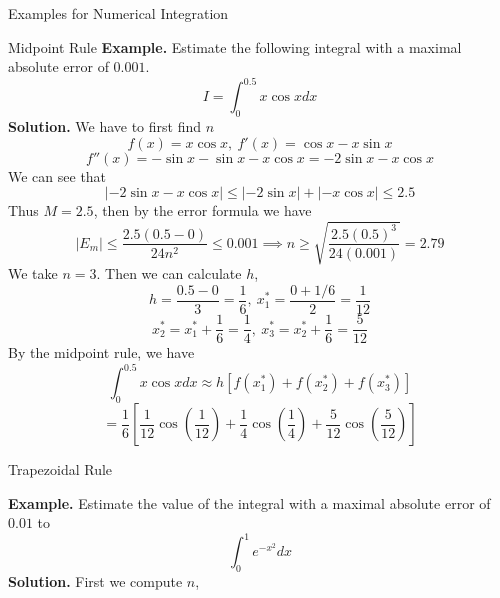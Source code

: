\documentclass{article}
\begin{document}
\begin{multicols*}{3}
\begin{blackbox}{Examples for Numerical Integration}
\begin{bluebox}{Midpoint Rule}
            {\small
            \textbf{Example.} Estimate the following integral with a maximal absolute error of $0.001$.\\[-2ex]
            \[I = \int_0^{0.5}x\cos x dx\]
            \textbf{Solution.} We have to first find $n$ \\[-2ex]
            \[f(x) = x\cos x, \ f'(x) = \cos x - x\sin x\]
            \[f''(x) = -\sin x - \sin x - x\cos x = -2\sin x - x\cos x \]
            We can see that \\[-2ex]
            \[|-2\sin x - x\cos x| \leq |-2\sin x| + |-x\cos x| \leq 2.5\]
            Thus $M = 2.5$, then by the error formula we have\\[-2ex]
            {\footnotesize
            \[|E_m| \leq \frac{2.5(0.5-0)}{24n^2} \leq 0.001  \implies n \geq \sqrt{\frac{2.5(0.5)^3}{24(0.001)}} = 2.79\]
            }
            We take $n = 3$. Then we can calculate $h$,\\[-2ex]
            \[h = \frac{0.5 -0}{3} = \frac{1}{6}, \ x_1^* = \frac{0 + 1/6}{2} = \frac{1}{12}\]
            \[x_2^* = x_1^* + \frac{1}{6} = \frac{1}{4}, \ x_3^* = x_2^* + \frac{1}{6} = \frac{5}{12}\]
            By the midpoint rule, we have\\[-1.5ex]
            \[\int_{0}^{0.5} x\cos x dx \approx h[f(x_1^*) + f(x_2^*) + f(x_3^*)]\]
            \[= \frac{1}{6}\left[\frac{1}{12}\cos \left(\frac{1}{12}\right) + \frac{1}{4}\cos \left(\frac{1}{4}\right) + \frac{5}{12}\cos \left(\frac{5}{12}\right)\right]\]
            }
            \vspace{-2.25ex}
        \end{bluebox}
        \begin{brownbox}{Trapezoidal Rule}
            {\small
            \textbf{Example.} Estimate the value of the integral with a maximal absolute error of $0.01$ to 
            \[\int_0^1 e^{-x^2}dx\]
            \vspace{-0.5ex}
            \textbf{Solution.} First we compute $n$, \\[-2ex]
            {\scriptsize
            
}}
\end{brownbox}
\end{blackbox}
\end{multicols*}
\end{document}
